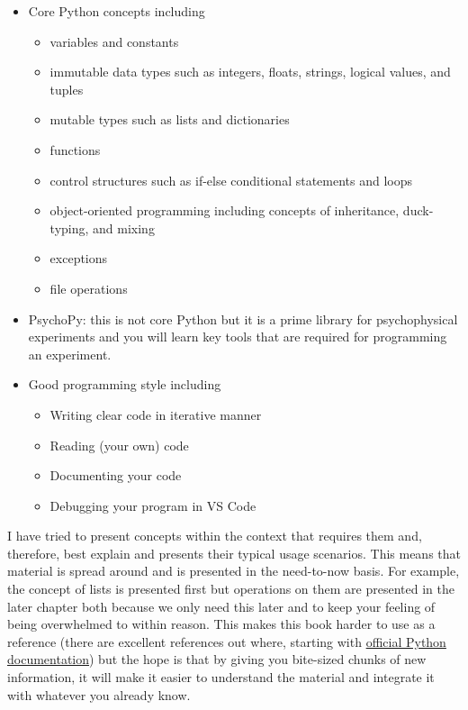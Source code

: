 \documentclass[
]{book}
\providecommand{\tightlist}{%
  \setlength{\itemsep}{0pt}\setlength{\parskip}{0pt}}
\begin{document}
\begin{itemize}
\tightlist
\item
  Core Python concepts including

  \begin{itemize}
  \tightlist
  \item
    variables and constants
  \item
    immutable data types such as integers, floats, strings, logical values, and tuples
  \item
    mutable types such as lists and dictionaries
  \item
    functions
  \item
    control structures such as if-else conditional statements and loops
  \item
    object-oriented programming including concepts of inheritance, duck-typing, and mixing
  \item
    exceptions
  \item
    file operations
  \end{itemize}
\item
  PsychoPy: this is not core Python but it is a prime library for psychophysical experiments and you will learn key tools that are required for programming an experiment.
\item
  Good programming style including

  \begin{itemize}
  \tightlist
  \item
    Writing clear code in iterative manner
  \item
    Reading (your own) code
  \item
    Documenting your code
  \item
    Debugging your program in VS Code
  \end{itemize}
\end{itemize}

I have tried to present concepts within the context that requires them and, therefore, best explain and presents their typical usage scenarios. This means that material is spread around and is presented in the need-to-now basis. For example, the concept of lists is presented first but operations on them are presented in the later chapter both because we only need this later and to keep your feeling of being overwhelmed to within reason. This makes this book harder to use as a reference (there are excellent references out where, starting with \href{https://docs.python.org/3/}{official Python documentation}) but the hope is that by giving you bite-sized chunks of new information, it will make it easier to understand the material and integrate it with whatever you already know.
\end{document}

